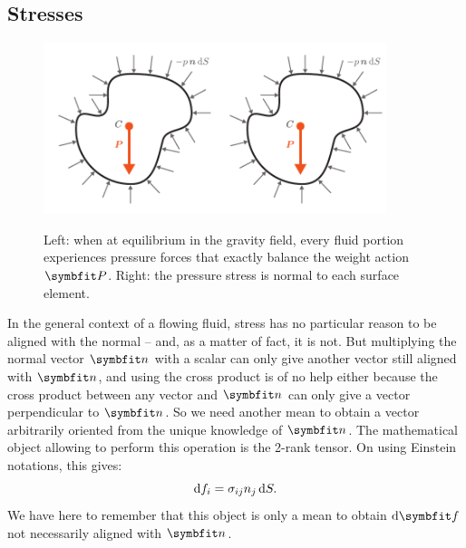 \subsection{Stresses}
\begin{figure}[htbp]
\begin{center}
\includegraphics[page=1,width=5cm]{./pics/01_pics.pdf}\qquad\includegraphics[page=2,width=5cm]{./pics/01_pics.pdf}
\caption{Left: when at equilibrium in the gravity field, every fluid portion experiences pressure forces that exactly balance the weight action $\bP$. Right: the pressure stress is normal to each surface element.}
\label{fig:archimedes}
\end{center}
\end{figure}
In the general context of a flowing fluid, stress has no particular reason to be aligned with the normal -- and, as a matter of fact, it is not. But multiplying the normal vector $\bn$ with a scalar can only give another vector still aligned with $\bn$, and using the cross product is of no help either because the cross product between any vector and $\bn$ can only give a vector perpendicular to $\bn$. So we need another mean to obtain a vector arbitrarily oriented from the unique knowledge of $\bn$. The mathematical object allowing to perform this operation is the 2-rank tensor. On using Einstein notations, this gives:
\begin{equation}
\mathrm df_i = \sigma_{ij} n_j \, \mathrm dS.
\end{equation}
We have here to remember that this object is only a mean to obtain $\mathrm d \bff$ not necessarily aligned with $\bn$.

